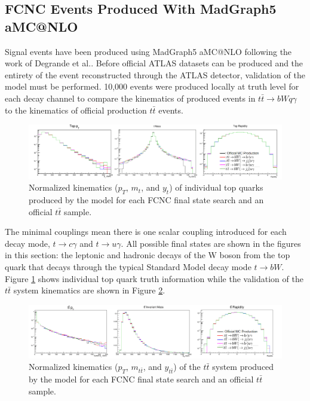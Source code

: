 \subsection{FCNC Events Produced With MadGraph5 aMC@NLO}

Signal events have been produced using MadGraph5 aMC@NLO following the work of Degrande et al.\cite{Degrande:2014tta}.  Before official ATLAS datasets can be produced and the entirety of the event reconstructed through the ATLAS detector, validation of the model must be performed.  10,000 events were produced locally at truth level for each decay channel to compare the kinematics of produced events in $t\bar{t}\rightarrow bWq\gamma$ to the kinematics of official production $t\bar{t}$ events. 

\begin{figure}[h!]
	\centering
	\includegraphics[width=\columnwidth]{../ThesisImages/FCNCValidation/singleTops.png}
	\caption{ Normalized kinematics ($p_T$, $m_t$, and $y_t$) of individual top quarks produced by the model for each FCNC final state search and an official $t\bar{t}$ sample.
	}
	\label{fig:randomfinal1}
\end{figure}


The minimal couplings mean there is one scalar coupling introduced for each decay mode, $t\rightarrow c\gamma$ and $t\rightarrow u\gamma$.  All possible final states are shown in the figures in this section: the leptonic and hadronic decays of the W boson from the top quark that decays through the typical Standard Model decay mode $t\rightarrow bW$.  Figure \ref{fig:randomfinal1} shows individual top quark truth information while the validation of the $t\bar{t}$ system kinematics are shown in Figure \ref{fig:randomfinal2}.

\begin{figure}[h!]
	\centering
	\includegraphics[width=\columnwidth]{../ThesisImages/FCNCValidation/ttBarSys.png}
	\caption{Normalized kinematics ($p_T$, $m_{t\bar{t}}$, and $y_{t\bar{t}}$) of the $t\bar{t}$ system produced by the model for each FCNC final state search and an official $t\bar{t}$ sample.
	}
	\label{fig:randomfinal2}
\end{figure}

